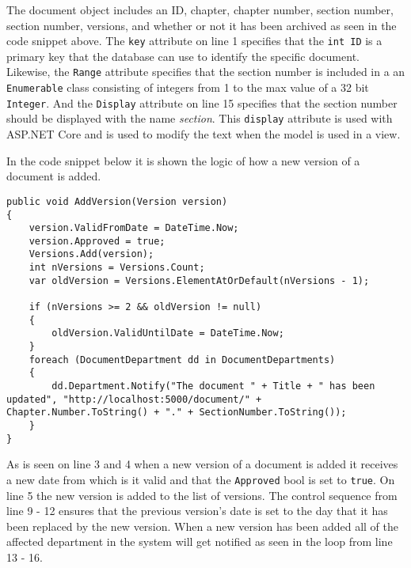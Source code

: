The document object includes an ID, chapter, chapter number, section number, section number, versions, and whether or not it has been archived as seen in the code snippet above.
The \texttt{key} attribute on line 1 specifies that the \texttt{int ID} is a primary key that the database can use to identify the specific document.
Likewise, the \texttt{Range} attribute specifies that the section number is included in a an \texttt{Enumerable} class consisting of integers from 1 to the max value of a 32 bit \texttt{Integer}. %
And the \texttt{Display} attribute on line 15 specifies that the section number should be displayed with the name \textit{section}.
This \texttt{display} attribute is used with ASP.NET Core and is used to modify the text when the model is used in a view.

In the code snippet below it is shown the logic of how a new version of a document is added.
\\

\begin{lstlisting}[caption={Document Model: AddVersion}, label={lst:addversion}]
public void AddVersion(Version version)
{
	version.ValidFromDate = DateTime.Now;
	version.Approved = true;
	Versions.Add(version);
	int nVersions = Versions.Count;
	var oldVersion = Versions.ElementAtOrDefault(nVersions - 1);

	if (nVersions >= 2 && oldVersion != null)
	{
		oldVersion.ValidUntilDate = DateTime.Now;
	}
	foreach (DocumentDepartment dd in DocumentDepartments)
	{
		dd.Department.Notify("The document " + Title + " has been updated", "http://localhost:5000/document/" + Chapter.Number.ToString() + "." + SectionNumber.ToString());
	}
}
\end{lstlisting}

As is seen on line 3 and 4 when a new version of a document is added it receives a new date from which is it valid and that the \texttt{Approved} bool is set to \texttt{true}.
On line 5 the new version is added to the list of versions.
The control sequence from line 9 - 12 ensures that the previous version's date is set to the day that it has been replaced by the new version.
When a new version has been added all of the affected department in the system will get notified as seen in the loop from line 13 - 16.

